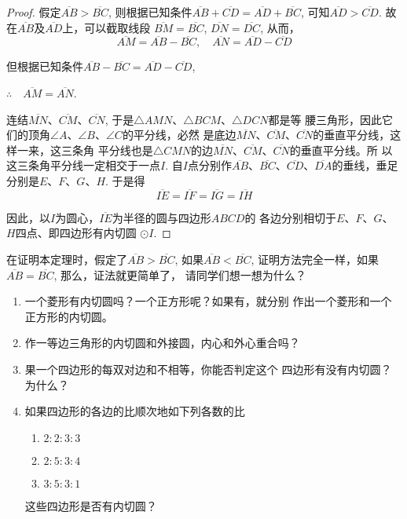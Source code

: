 \begin{proof}
    假定$\overline{AB}>\overline{BC}$, 则根据已知条件$\overline{AB}+\overline{CD}=\overline{AD}+
    \overline{BC}$, 可知$\overline{AD}>\overline{CD}$. 故在$\overline{AB}$及$\overline{AD}$上，可以截取线段
    $\overline{BM}=\overline{BC}$, $\overline{DN}=\overline{DC}$, 从而，
\[\overline{AM}=\overline{AB}-\overline{BC},\quad \overline{AN}=\overline{AD}-\overline{CD}\]

但根据已知条件$\overline{AB}-\overline{BC}=\overline{AD}-\overline{CD}$, 

$\therefore\quad \overline{AM}=\overline{AN}$.

连结$\overline{MN}$、$\overline{CM}$、$\overline{CN}$, 于是$\triangle AMN$、$\triangle BCM$、$\triangle DCN$都是等
腰三角形，因此它们的顶角$\angle A$、$\angle B$、$\angle C$的平分线，必然
是底边$\overline{MN}$、$\overline{CM}$、$\overline{CN}$的垂直平分线，这样一来，这三条角
平分线也是$\triangle CMN$的边$\overline{MN}$、$\overline{CM}$、$\overline{CN}$的垂直平分线。所
以这三条角平分线一定相交于一点$I$. 自$I$点分别作$\overline{AB}$、$\overline{BC}$、$\overline{CD}$、$\overline{DA}$的垂线，垂足分别是$E$、$F$、$G$、$H$. 于是得
\[\overline{IE}=\overline{IF}=\overline{IG}=\overline{IH}\]

因此，以$I$为圆心，$\overline{IE}$为半径的圆与四边形$ABCD$的
各边分别相切于$E$、$F$、$G$、$H$四点、即四边形有内切圆
$\odot I$. 
\end{proof}

\begin{rmk}
    在证明本定理时，假定了$\overline{AB}>\overline{BC}$, 如果$\overline{AB}<\overline{BC}$, 
证明方法完全一样，如果$\overline{AB}=\overline{BC}$, 那么，证法就更简单了，
请同学们想一想为什么？
\end{rmk}

\begin{ex}
\begin{enumerate}
    \item 一个菱形有内切圆吗？一个正方形呢？如果有，就分别
    作出一个菱形和一个正方形的内切圆。
    \item 作一等边三角形的内切圆和外接圆，内心和外心重合吗？
    \item 果一个四边形的每双对边和不相等，你能否判定这个
    四边形有没有内切圆？为什么？
    \item 如果四边形的各边的比顺次地如下列各数的比
\begin{multicols}{3}
\begin{enumerate}
    \item $2:2:3:3$
    \item $2:5:3:4$
    \item $3:5:3:1$
\end{enumerate}
\end{multicols}
这些四边形是否有内切圆？
\end{enumerate}
\end{ex}

